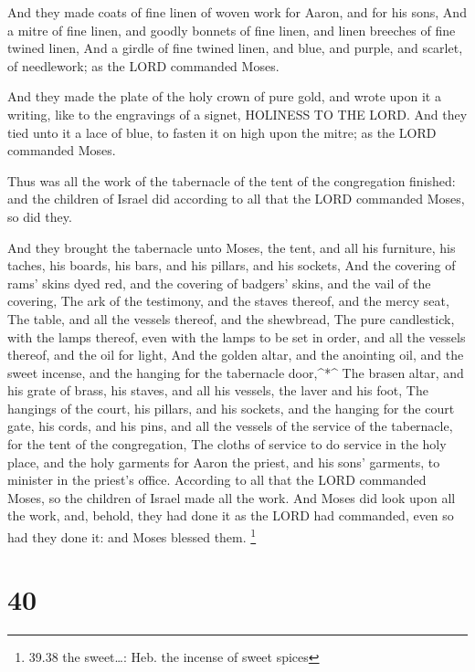  And they made coats of fine linen of woven work for Aaron,
and for his sons,  And a mitre of fine linen, and goodly
bonnets of fine linen, and linen breeches of fine twined linen,
 And a girdle of fine twined linen, and blue, and purple,
and scarlet, of needlework; as the LORD commanded Moses.

 And they made the plate of the holy crown of pure gold,
and wrote upon it a writing, like to the engravings of a signet,
HOLINESS TO THE LORD.  And they tied unto it a lace of
blue, to fasten it on high upon the mitre; as the LORD commanded Moses.

 Thus was all the work of the tabernacle of the tent of the
congregation finished: and the children of Israel did according to all
that the LORD commanded Moses, so did they.

 And they brought the tabernacle unto Moses, the tent, and
all his furniture, his taches, his boards, his bars, and his pillars,
and his sockets,  And the covering of rams' skins dyed red,
and the covering of badgers' skins, and the vail of the covering,
 The ark of the testimony, and the staves thereof, and the
mercy seat,  The table, and all the vessels thereof, and
the shewbread,  The pure candlestick, with the lamps
thereof, even with the lamps to be set in order, and all the vessels
thereof, and the oil for light,  And the golden altar, and
the anointing oil, and the sweet incense, and the hanging for the
tabernacle door,\^{}*\^{}  The brasen altar, and his grate
of brass, his staves, and all his vessels, the laver and his foot,
 The hangings of the court, his pillars, and his sockets,
and the hanging for the court gate, his cords, and his pins, and all the
vessels of the service of the tabernacle, for the tent of the
congregation,  The cloths of service to do service in the
holy place, and the holy garments for Aaron the priest, and his sons'
garments, to minister in the priest's office.  According to
all that the LORD commanded Moses, so the children of Israel made all
the work.  And Moses did look upon all the work, and,
behold, they had done it as the LORD had commanded, even so had they
done it: and Moses blessed them. \footnote{39.38 the sweet\ldots: Heb.
  the incense of sweet spices}

\hypertarget{section-39}{%
\section{40}\label{section-39}}

